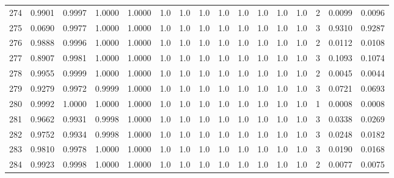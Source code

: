 \begin{tabular}{lrrrrrrrrrrrrrrr}
274 &      0.9901 &  0.9997 &  1.0000 &  1.0000 &     1.0 &     1.0 &     1.0 &     1.0 &     1.0 &     1.0 &      1.0 &        1.0 &      2 &                    0.0099 &                     0.0096 \\
275 &      0.0690 &  0.9977 &  1.0000 &  1.0000 &     1.0 &     1.0 &     1.0 &     1.0 &     1.0 &     1.0 &      1.0 &        1.0 &      3 &                    0.9310 &                     0.9287 \\
276 &      0.9888 &  0.9996 &  1.0000 &  1.0000 &     1.0 &     1.0 &     1.0 &     1.0 &     1.0 &     1.0 &      1.0 &        1.0 &      2 &                    0.0112 &                     0.0108 \\
277 &      0.8907 &  0.9981 &  1.0000 &  1.0000 &     1.0 &     1.0 &     1.0 &     1.0 &     1.0 &     1.0 &      1.0 &        1.0 &      3 &                    0.1093 &                     0.1074 \\
278 &      0.9955 &  0.9999 &  1.0000 &  1.0000 &     1.0 &     1.0 &     1.0 &     1.0 &     1.0 &     1.0 &      1.0 &        1.0 &      2 &                    0.0045 &                     0.0044 \\
279 &      0.9279 &  0.9972 &  0.9999 &  1.0000 &     1.0 &     1.0 &     1.0 &     1.0 &     1.0 &     1.0 &      1.0 &        1.0 &      3 &                    0.0721 &                     0.0693 \\
280 &      0.9992 &  1.0000 &  1.0000 &  1.0000 &     1.0 &     1.0 &     1.0 &     1.0 &     1.0 &     1.0 &      1.0 &        1.0 &      1 &                    0.0008 &                     0.0008 \\
281 &      0.9662 &  0.9931 &  0.9998 &  1.0000 &     1.0 &     1.0 &     1.0 &     1.0 &     1.0 &     1.0 &      1.0 &        1.0 &      3 &                    0.0338 &                     0.0269 \\
282 &      0.9752 &  0.9934 &  0.9998 &  1.0000 &     1.0 &     1.0 &     1.0 &     1.0 &     1.0 &     1.0 &      1.0 &        1.0 &      3 &                    0.0248 &                     0.0182 \\
283 &      0.9810 &  0.9978 &  1.0000 &  1.0000 &     1.0 &     1.0 &     1.0 &     1.0 &     1.0 &     1.0 &      1.0 &        1.0 &      3 &                    0.0190 &                     0.0168 \\
284 &      0.9923 &  0.9998 &  1.0000 &  1.0000 &     1.0 &     1.0 &     1.0 &     1.0 &     1.0 &     1.0 &      1.0 &        1.0 &      2 &                    0.0077 &                     0.0075 \\

\end{tabular}
